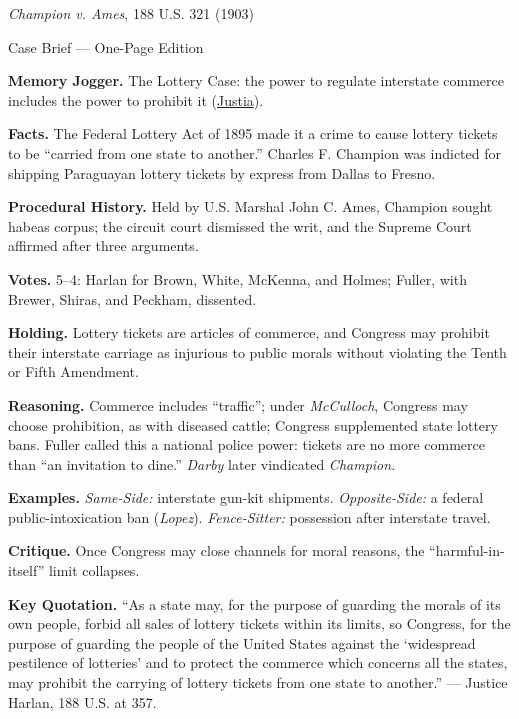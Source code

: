 \documentclass[12pt]{article}
\begin{document}
\begin{center}
{\Large \textit{Champion v. Ames}, 188 U.S. 321 (1903)\par}
\vspace{0.3em}
{\normalsize Case Brief --- One-Page Edition\par}
\end{center}

\textbf{Memory Jogger.} The Lottery Case: the power to regulate interstate commerce includes the power to prohibit it (\href{https://supreme.justia.com/cases/federal/us/188/321/}{Justia}).

\textbf{Facts.} The Federal Lottery Act of 1895 made it a crime to cause lottery tickets to be ``carried from one state to another.'' Charles F. Champion was indicted for shipping Paraguayan lottery tickets by express from Dallas to Fresno.

\textbf{Procedural History.} Held by U.S. Marshal John C. Ames, Champion sought habeas corpus; the circuit court dismissed the writ, and the Supreme Court affirmed after three arguments.

\textbf{Votes.} 5--4: Harlan for Brown, White, McKenna, and Holmes; Fuller, with Brewer, Shiras, and Peckham, dissented.

\textbf{Holding.} Lottery tickets are articles of commerce, and Congress may prohibit their interstate carriage as injurious to public morals without violating the Tenth or Fifth Amendment.

\textbf{Reasoning.} Commerce includes ``traffic''; under \textit{McCulloch}, Congress may choose prohibition, as with diseased cattle; Congress supplemented state lottery bans. Fuller called this a national police power: tickets are no more commerce than ``an invitation to dine.'' \textit{Darby} later vindicated \textit{Champion}.

\textbf{Examples.} \emph{Same-Side:} interstate gun-kit shipments. \emph{Opposite-Side:} a federal public-intoxication ban (\textit{Lopez}). \emph{Fence-Sitter:} possession after interstate travel.

\textbf{Critique.} Once Congress may close channels for moral reasons, the ``harmful-in-itself'' limit collapses.

\textbf{Key Quotation.} ``As a state may, for the purpose of guarding the morals of its own people, forbid all sales of lottery tickets within its limits, so Congress, for the purpose of guarding the people of the United States against the `widespread pestilence of lotteries' and to protect the commerce which concerns all the states, may prohibit the carrying of lottery tickets from one state to another.'' --- Justice Harlan, 188 U.S. at 357.
\end{document}
